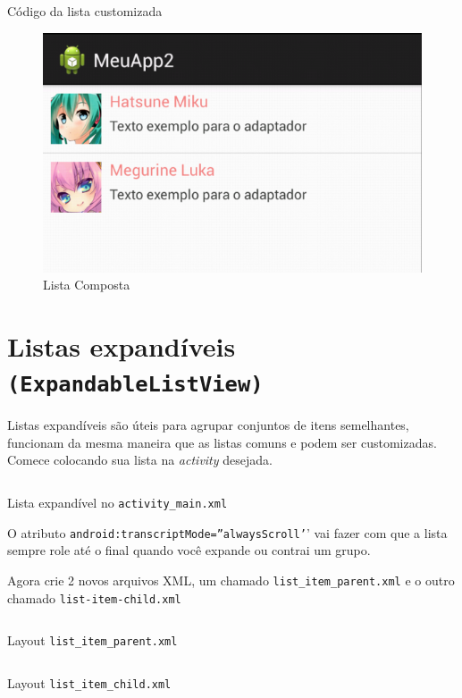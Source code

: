 \documentclass[a4paper,12pt,brazil,doubleside]{book}
\begin{document}
\begin{singlespace}
\begin{listing}[H]
\inputminted[linenos=true,fontsize=\small,frame=lines, framesep=2mm, tabsize=2,numbersep=5pt]{java}{src/design/customlist.java}
\caption{Código da lista customizada}
\end{listing}	

\begin{figure}[H]
  \centering
  \includegraphics[width=.475\textwidth]{figuras/design/lista-composta.png}
  \caption{Lista Composta}
  \label{fig:e}
\end{figure}

\section{Listas expandíveis \texttt{(ExpandableListView)}}

Listas expandíveis são úteis para agrupar conjuntos de itens semelhantes, funcionam da mesma maneira que as listas comuns e podem ser customizadas.
Comece colocando sua lista na \emph{activity} desejada.
	
\begin{listing}[H]
\inputminted[linenos=true,fontsize=\small,frame=lines, framesep=2mm, tabsize=2,numbersep=5pt]{xml}{src/design/exlist.xml}
\caption{Lista expandível no \texttt{activity\_main.xml}}
\end{listing}	

O atributo \texttt{android:transcriptMode=''alwaysScroll'}' vai fazer com que a lista sempre role até o final quando você expande ou contrai um grupo.
 
Agora crie 2 novos arquivos XML, um chamado \texttt{list\_item\_parent.xml} e o outro chamado \texttt{list-item-child.xml}

\begin{listing}[H]
\inputminted[linenos=true,fontsize=\small,frame=lines, framesep=2mm, tabsize=2,numbersep=5pt]{xml}{src/design/list-item-parent.xml}
\caption{Layout \texttt{list\_item\_parent.xml}}
\end{listing}	

\begin{listing}[H]
\inputminted[linenos=true,fontsize=\small,frame=lines, framesep=2mm, tabsize=2,numbersep=5pt]{xml}{src/design/list-item-child.xml}
\caption{Layout \texttt{list\_item\_child.xml}}
\end{listing}	


\end{singlespace}
\end{document}

